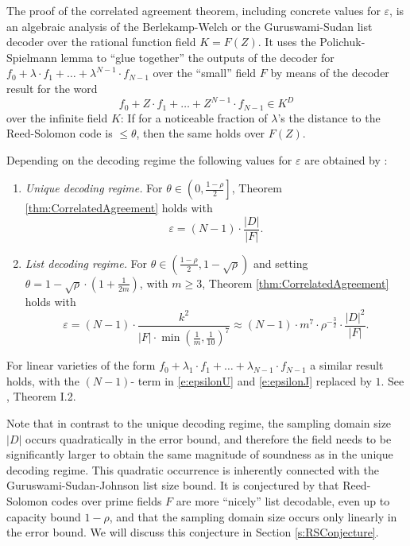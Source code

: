 \documentclass[11pt,article,oneside]{memoir}
\theoremstyle{definition}
\theoremstyle{remark}
\begin{document}
The proof of the correlated agreement theorem, including concrete values for $\varepsilon$, is an algebraic analysis of the Berlekamp-Welch or the Guruswami-Sudan list decoder over the rational function field $K=F(Z)$. 
It uses the Polichuk-Spielmann lemma to “glue together” the outputs of the decoder for $f_0 + \lambda\cdot f_1 + \ldots +\lambda^{N-1}\cdot f_{N-1}$ over the “small” field $F$ by means of the decoder result for the word 
\[
f_0 + Z\cdot f_1 + \ldots + Z^{N-1}\cdot f_{N-1} \in K^D
\]
over the infinite field $K$: 
If for a noticeable fraction of  $\lambda$’s the distance to the Reed-Solomon code is $\leq\theta$, then the same holds over $F(Z)$.

Depending on the decoding regime the following values for $\varepsilon$ are obtained by \cite{ProximityGaps}:
\begin{enumerate}
\item
\textit{Unique decoding regime.} 
For $\theta\in \left(0,\frac{1-\rho}{2}\right]$, Theorem \ref{thm:CorrelatedAgreement} holds with
\begin{equation}
\label{e:epsilonU}
\varepsilon = (N-1)\cdot \frac{|D|}{|F|}.
\end{equation}
\item
\textit{List decoding regime.} 
For $\theta\in \left(\frac{1-\rho}{2},1-\sqrt\rho\right)$ and setting $\theta =1-\sqrt\rho \cdot\left(1 +\frac{1}{2m}\right)$, with $m\geq 3$, Theorem \ref{thm:CorrelatedAgreement} holds with
\begin{equation}
\label{e:epsilonJ}
\varepsilon =  (N-1)\cdot \frac{k^2}{|F|\cdot \min\left(\frac{1}{m}, \frac{1}{10}\right)^7}
\approx (N-1)\cdot m^7\cdot \rho^{-\frac{3}{2}} \cdot \frac{|D|^2}{|F|}.
\end{equation}
\end{enumerate}

For linear varieties of the form $f_0 + \lambda_1\cdot f_1+  \ldots + \lambda_{N-1}\cdot f_{N-1}$ a similar result holds, with the $(N-1)$- term in \eqref{e:epsilonU} and \eqref{e:epsilonJ} replaced by $1$. 
See \cite{ProximityGaps}, Theorem I.2. %

Note that in contrast to the unique decoding regime, the sampling domain size $|D|$ occurs quadratically in the error bound, and therefore the field needs to be significantly larger to obtain the same magnitude of soundness as in the unique decoding regime.  
This quadratic occurrence is inherently connected with the Guruswami-Sudan-Johnson list size bound. 
It is conjectured by \cite{DEEPFRI} that Reed-Solomon codes over prime fields $F$ are more “nicely” list decodable, even up to capacity bound $1-\rho$, and that the sampling domain size occurs only linearly in the error bound. 
We will discuss this conjecture in Section \ref{s:RSConjecture}. 
\end{document}
